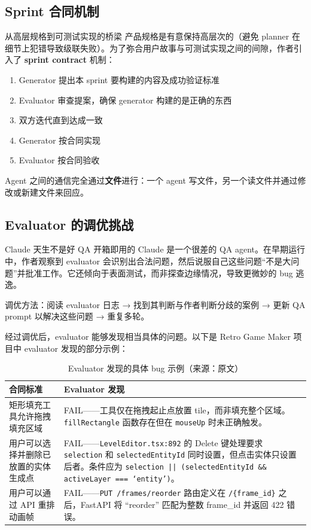 \documentclass[a4paper]{article}
\begin{document}
\subsection{Sprint 合同机制}

\begin{knowledgebox}{从高层规格到可测试实现的桥梁}
产品规格是有意保持高层次的（避免 planner 在细节上犯错导致级联失败）。为了弥合用户故事与可测试实现之间的间隙，作者引入了 \textbf{sprint contract} 机制：

\begin{enumerate}
    \item Generator 提出本 sprint 要构建的内容及成功验证标准
    \item Evaluator 审查提案，确保 generator 构建的是正确的东西
    \item 双方迭代直到达成一致
    \item Generator 按合同实现
    \item Evaluator 按合同验收
\end{enumerate}

Agent 之间的通信完全通过\textbf{文件}进行：一个 agent 写文件，另一个读文件并通过修改或新建文件来回应。
\end{knowledgebox}

\subsection{Evaluator 的调优挑战}

\begin{warningbox}{Claude 天生不是好 QA}
开箱即用的 Claude 是一个很差的 QA agent。在早期运行中，作者观察到 evaluator 会识别出合法问题，然后说服自己这些问题``不是大问题''并批准工作。它还倾向于表面测试，而非探查边缘情况，导致更微妙的 bug 逃逸。

调优方法：阅读 evaluator 日志 → 找到其判断与作者判断分歧的案例 → 更新 QA prompt 以解决这些问题 → 重复多轮。
\end{warningbox}

经过调优后，evaluator 能够发现相当具体的问题。以下是 Retro Game Maker 项目中 evaluator 发现的部分示例：

\begin{table}[H]
\centering
\small
\begin{tabular}{p{4.5cm}p{8.5cm}}
\toprule
\textbf{合同标准} & \textbf{Evaluator 发现} \\
\midrule
矩形填充工具允许拖拽填充区域 & FAIL——工具仅在拖拽起止点放置 tile，而非填充整个区域。\texttt{fillRectangle} 函数存在但在 \texttt{mouseUp} 时未正确触发。 \\
\midrule
用户可以选择并删除已放置的实体生成点 & FAIL——\texttt{LevelEditor.tsx:892} 的 Delete 键处理要求 \texttt{selection} 和 \texttt{selectedEntityId} 同时设置，但点击实体只设置后者。条件应为 \texttt{selection || (selectedEntityId \&\& activeLayer === `entity')}。 \\
\midrule
用户可以通过 API 重排动画帧 & FAIL——\texttt{PUT /frames/reorder} 路由定义在 \texttt{/\{frame\_id\}} 之后，FastAPI 将 ``reorder'' 匹配为整数 frame\_id 并返回 422 错误。 \\
\bottomrule
\end{tabular}
\caption{Evaluator 发现的具体 bug 示例（来源：原文）}
\end{table}
\end{document}
